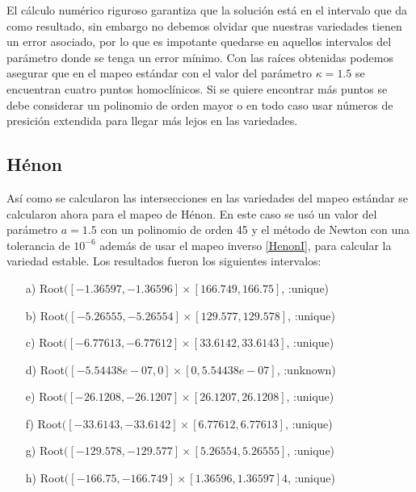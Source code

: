 El cálculo numérico riguroso garantiza que la solución está en el intervalo que da como resultado, sin embargo no debemos olvidar que nuestras variedades tienen un error asociado, por lo que es impotante quedarse en aquellos intervalos del parámetro donde se tenga un error mínimo. Con las raíces obtenidas podemos asegurar que en el mapeo estándar con el valor del parámetro $\kappa=1.5$ se encuentran cuatro puntos homoclínicos. Si se quiere encontrar más puntos se debe considerar un polinomio de orden mayor o en todo caso usar números de presición extendida para llegar más lejos en las variedades. 



\subsection{Hénon}
Así como se calcularon las intersecciones en las variedades del mapeo estándar se calcularon ahora para el mapeo de Hénon. En este caso se usó un valor del parámetro $a=1.5$ con un polinomio de orden 45 y el método de Newton con una tolerancia de $10^{-6}$ además de usar el mapeo inverso \ref{HenonI}, para calcular la variedad estable. Los resultados fueron los siguientes intervalos:
\begin{itemize}
\item[a)] Root$([-1.36597, -1.36596] \times [166.749, 166.75]$, :unique)
\item[b)] Root$([-5.26555, -5.26554] \times [129.577, 129.578]$, :unique)
\item[c)] Root$([-6.77613, -6.77612] \times [33.6142, 33.6143]$, :unique)
\item[d)] Root$([-5.54438e-07, 0] \times [0, 5.54438e-07]$, :unknown)     
\item[e)] Root$([-26.1208, -26.1207] \times [26.1207, 26.1208]$, :unique)  
\item[f)] Root$([-33.6143, -33.6142] \times [6.77612, 6.77613]$, :unique)  
\item[g)] Root$([-129.578, -129.577] \times [5.26554, 5.26555]$, :unique) 
\item[h)] Root$([-166.75, -166.749] \times [1.36596, 1.36597]4$, :unique)
\end{itemize}

